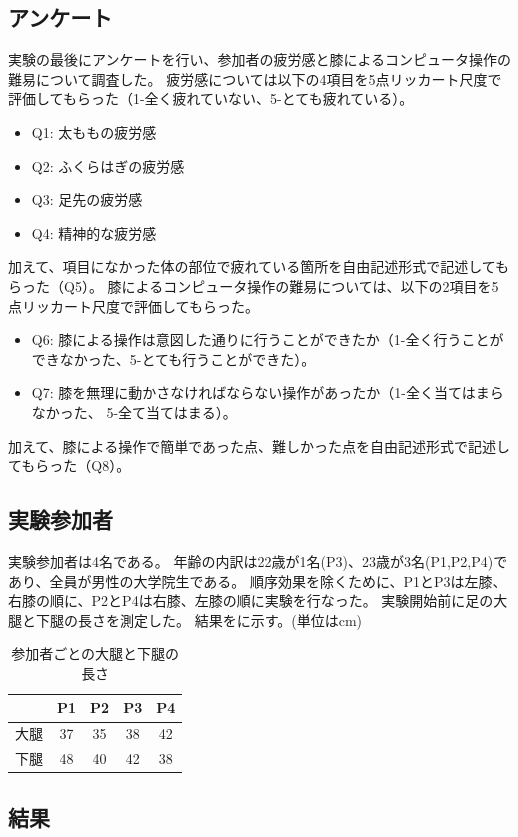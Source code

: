 \documentclass[submit, techrep]{ipsj}
\begin{document}
\subsection{アンケート}
実験の最後にアンケートを行い、参加者の疲労感と膝によるコンピュータ操作の難易について調査した。
疲労感については以下の4項目を5点リッカート尺度で評価してもらった（1-全く疲れていない、5-とても疲れている）。
\begin{itemize}
	\item {Q1: }太ももの疲労感
	\item {Q2: }ふくらはぎの疲労感
	\item {Q3: }足先の疲労感
	\item {Q4: }精神的な疲労感
\end{itemize}
加えて、項目になかった体の部位で疲れている箇所を自由記述形式で記述してもらった（Q5）。
膝によるコンピュータ操作の難易については、以下の2項目を5点リッカート尺度で評価してもらった。
\begin{itemize}
	\item {Q6: }膝による操作は意図した通りに行うことができたか（1-全く行うことができなかった、5-とても行うことができた）。
	\item {Q7: }膝を無理に動かさなければならない操作があったか（1-全く当てはまらなかった、 5-全て当てはまる）。
\end{itemize}
加えて、膝による操作で簡単であった点、難しかった点を自由記述形式で記述してもらった（Q8）。
\subsection{実験参加者}
実験参加者は4名である。
年齢の内訳は22歳が1名(P3)、23歳が3名(P1,P2,P4)であり、全員が男性の大学院生である。
順序効果を除くために、P1とP3は左膝、右膝の順に、P2とP4は右膝、左膝の順に実験を行なった。
実験開始前に足の大腿と下腿の長さを測定した。
結果をに示す。(単位は\si{cm})
\begin{table}[tb]
	\begin{center}
		\begin{tabular}{|c|c|c|c|c|}
		\hline
			& P1 & P2 & P3 & P4 \\ \hline
		大腿 & 37 & 35 & 38 & 42 \\ \hline
		下腿 & 48 & 40 & 42 & 38 \\ \hline
		\end{tabular}
	\end{center}
	\caption{参加者ごとの大腿と下腿の長さ}
	\label{tb:length}
\end{table}
\subsection{結果}
\end{document}
